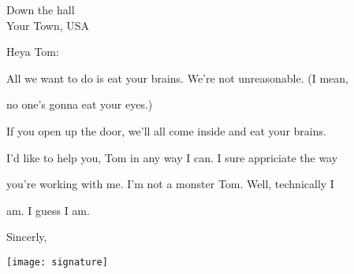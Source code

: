 \documentclass{letter}
\begin{document}
\longindentation=0pt

\begin{letter}{  Down the hall \\ Your Town, USA }

\opening{  Heya Tom: }


All we want to do is eat your brains. We're not unreasonable. (I mean,

no one's gonna eat your eyes.)

If you open up the door, we'll all come inside and eat your brains.

I'd like to help you, Tom in any way I can. I sure appriciate the way

you're working with me. I'm not a monster Tom. Well, technically I

am. I guess I am.

\vspace{1 em}

\closing{Sincerly,}



\vspace{-.85in}
\texttt{[image: signature]}


\end{letter}
\end{document}
